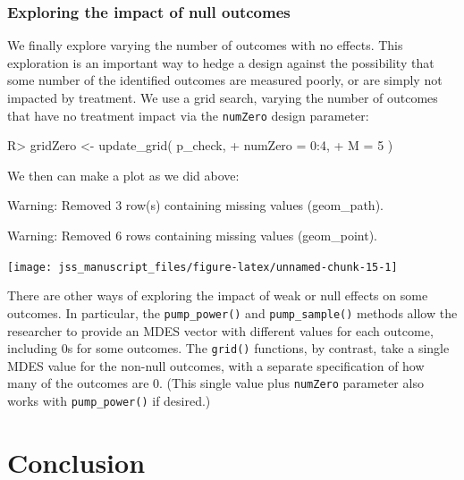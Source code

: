 \documentclass[
]{jss}
\begin{document}
\subsubsection{Exploring the impact of null outcomes}

We finally explore varying the number of outcomes with no effects. This
exploration is an important way to hedge a design against the
possibility that some number of the identified outcomes are measured
poorly, or are simply not impacted by treatment. We use a grid search,
varying the number of outcomes that have no treatment impact via the
\texttt{numZero} design parameter:

\begin{CodeChunk}
\begin{CodeInput}
R> gridZero <- update_grid( p_check,
+                          numZero = 0:4,
+                          M = 5 )
\end{CodeInput}
\end{CodeChunk}

We then can make a plot as we did above:

\begin{CodeChunk}
\begin{CodeOutput}
Warning: Removed 3 row(s) containing missing values (geom_path).
\end{CodeOutput}
\begin{CodeOutput}
Warning: Removed 6 rows containing missing values (geom_point).
\end{CodeOutput}


\begin{center}\texttt{[image: jss\_manuscript\_files/figure-latex/unnamed-chunk-15-1]} \end{center}

\end{CodeChunk}

There are other ways of exploring the impact of weak or null effects on
some outcomes. In particular, the \texttt{pump\_power()} and
\texttt{pump\_sample()} methods allow the researcher to provide an MDES
vector with different values for each outcome, including 0s for some
outcomes. The \texttt{grid()} functions, by contrast, take a single MDES
value for the non-null outcomes, with a separate specification of how
many of the outcomes are 0. (This single value plus \texttt{numZero}
parameter also works with \texttt{pump\_power()} if desired.)

\section{Conclusion}
\label{sec:conclusion}
\end{document}
